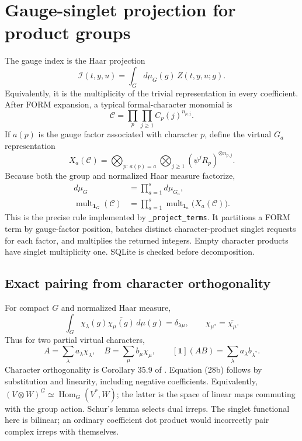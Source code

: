 \documentclass[11pt,a4paper]{article}
\newcommand{\code}[1]{{\small\nolinkurl{#1}}}
\begin{document}
\clearpage
\section{Gauge-singlet projection for product groups}\label{sec:projection}
The gauge index is the Haar projection
\begin{equation}
 \mathcal I(t,y,u)=\int_G d\mu_G(g)\,Z(t,y,u;g).
\end{equation}
Equivalently, it is the multiplicity of the trivial representation in every coefficient.
After FORM expansion, a typical formal-character monomial is
\begin{equation}
 \mathcal C=\prod_p\prod_{j\geq1}C_p(j)^{n_{p,j}}.
\end{equation}
If $a(p)$ is the gauge factor associated with character $p$, define the virtual
$G_a$ representation
\begin{equation}
 X_a(\mathcal C)=\bigotimes_{p:\,a(p)=a}\bigotimes_{j\geq1}(\psi^jR_p)^{\otimes n_{p,j}}.
\end{equation}
Because both the group and normalized Haar measure factorize,
\begin{align}
 d\mu_G&=\prod_{a=1}^s d\mu_{G_a},\\
 \operatorname{mult}_{\mathbf1_G}(\mathcal C)&=
 \prod_{a=1}^s\operatorname{mult}_{\mathbf1_a}\bigl(X_a(\mathcal C)\bigr).
\end{align}
This is the precise rule implemented by \code{_project_terms}. It partitions a
FORM term by gauge-factor position, batches distinct character-product singlet
requests for each factor, and multiplies the returned integers. Empty character
products have singlet multiplicity one. SQLite is checked before decomposition.

\subsection{Exact pairing from character orthogonality}
For compact $G$ and normalized Haar measure,
\begin{equation*}
 \int_G\chi_\lambda(g)\overline{\chi_\mu(g)}\,d\mu(g)=\delta_{\lambda\mu},
 \qquad \chi_{\mu^*}=\overline{\chi_\mu}.
 \tag{28a}
\end{equation*}
Thus for two partial virtual characters,
\begin{equation*}
 A=\sum_\lambda a_\lambda\chi_\lambda,\quad
 B=\sum_\mu b_\mu\chi_\mu,\qquad
 \boxed{[\mathbf1](AB)=\sum_\lambda a_\lambda b_{\lambda^*}.}
 \tag{28b}
\end{equation*}
Character orthogonality is Corollary 35.9 of \cite{etingof}. Equation (28b) follows
by substitution and linearity, including negative coefficients. Equivalently,
$(V\otimes W)^G\simeq\operatorname{Hom}_G(V^*,W)$; the latter is the space of
linear maps commuting with the group action. Schur's lemma selects dual irreps.
The singlet functional here is bilinear; an ordinary coefficient dot product
would incorrectly pair complex irreps with themselves.
\end{document}
